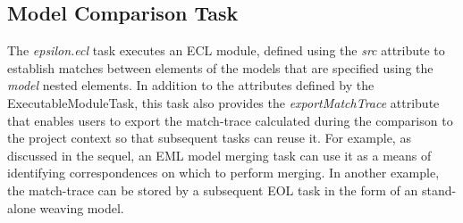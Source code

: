 \subsection{Model Comparison Task}

The \emph{epsilon.ecl} task executes an ECL module, defined using the \emph{src} attribute to establish matches between elements of the models that are specified using the \emph{model} nested elements. In addition to the attributes defined by the ExecutableModuleTask, this task also provides the \emph{exportMatchTrace} attribute that enables users to export the match-trace calculated during the comparison to the project context so that subsequent tasks can reuse it. For example, as discussed in the sequel, an EML model merging task can use it as a means of identifying correspondences on which to perform merging. In another example, the match-trace can be stored by a subsequent EOL task in the form of an stand-alone weaving model.

